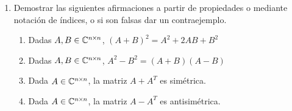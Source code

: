 \documentclass[a4paper]{article}
\newcommand{\exercise}{\item}
\begin{document}
\begin{enumerate}
\begin{enumerate} [label=(\alph*)]
		\item Calcular $x$, $y$ y $z$ para que $\left(\begin{matrix} x+2 & 0 \\ 3 & y^2+y \end{matrix}\right) =\left(\begin{matrix} -4 & 0 \\ z & 6 \end{matrix}\right)$
		\item Calcular $a$, $b$ y $c$ para que $\left(\begin{matrix} 3-a & b & -2 \\ 4 & 1-c & 6 \end{matrix}\right) + \left(\begin{matrix} 2 & a+b & 4 \\ 1-c & 2 & 0 \end{matrix}\right)=\left(\begin{matrix} -1 & a & 2 \\ 2 & 0 & 6 \end{matrix}\right)$
		\item Dada $A=\left(\begin{matrix} x & 3 \\ -2 & y \end{matrix}\right)$, calcular $x$ e $y$ para que que la matriz sea idempotente, es decir, $A^2=A$. 
	\end{enumerate}
	\exercise Demostrar las siguientes afirmaciones a partir de propiedades o mediante notación de índices, o si son falsas dar un contraejemplo.
	\begin{enumerate} [label=(\alph*)]
		\item Dadas $A,B \in \mathbb{C}^{n \hspace{-0.2mm}\times \hspace{-0.2mm} n}$, $(A+B)^2 = A^2 + 2AB+B^2$
		\item Dadas $A,B \in \mathbb{C}^{n \hspace{-0.2mm}\times \hspace{-0.2mm} n}$, $A^2-B^2 = (A+B)(A-B)$
		\item Dada $A \in \mathbb{C}^{n \hspace{-0.2mm}\times \hspace{-0.2mm} n}$, la matriz $A+A^T$ es simétrica.
		\item Dada $A \in \mathbb{C}^{n \hspace{-0.2mm}\times \hspace{-0.2mm} n}$, la matriz $A-A^T$ es antisimétrica.

\end{enumerate}
\end{enumerate}
\end{document}
